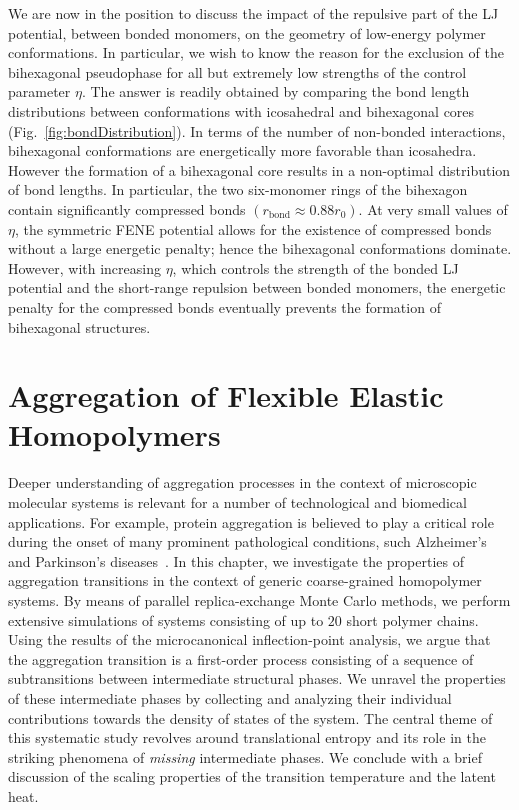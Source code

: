 \documentclass[12pt]{report}
\begin{document}
%
We are now in the position to discuss the impact of the repulsive part of the LJ potential, between bonded monomers, on the geometry of low-energy polymer conformations. In particular, we wish to know the reason for the exclusion of the bihexagonal pseudophase for all but extremely low strengths of the control parameter $\eta$. The answer is readily obtained by comparing the bond length distributions between conformations with icosahedral and bihexagonal cores (Fig.~\ref{fig:bondDistribution}). In terms of the number of non-bonded interactions, bihexagonal conformations are energetically more favorable than icosahedra.  However the formation of a bihexagonal core results in a non-optimal distribution of bond lengths. In particular, the two six-monomer rings of the bihexagon contain significantly compressed bonds $(r_{\mathrm{bond}} \approx 0.88 r_{0})$. At very small values of $\eta$, the symmetric FENE potential allows for the existence of compressed bonds without a large energetic penalty; hence the bihexagonal conformations dominate. However, with increasing $\eta$, which controls the strength of the bonded LJ potential and the short-range repulsion between bonded monomers, the energetic penalty for the compressed bonds eventually prevents the formation of bihexagonal structures. 


\chapter{Aggregation of Flexible Elastic Homopolymers}
\label{chap:Aggregation}

%
Deeper understanding of aggregation processes in the context of microscopic molecular systems is relevant for a number of technological and biomedical applications. For example, protein aggregation is believed to play a critical role during the onset of many prominent pathological conditions, such Alzheimer's and Parkinson's diseases~\cite{Selkoe,Chiti}. In this chapter, we investigate the properties of aggregation transitions in the context of generic coarse-grained homopolymer systems. By means of parallel replica-exchange Monte Carlo methods, we perform extensive simulations of systems consisting of up to $20$ short polymer chains. Using the results of the  microcanonical inflection-point analysis, we argue that the aggregation transition is a first-order process consisting of a sequence of subtransitions between intermediate structural phases. We unravel the properties of these intermediate phases by collecting and analyzing their individual contributions towards the density of states of the system. The central theme of this systematic study revolves around translational entropy and its role in the striking phenomena of \textit{missing} intermediate phases. We conclude with a brief discussion of the scaling properties of the transition temperature and the latent heat.
\end{document}
